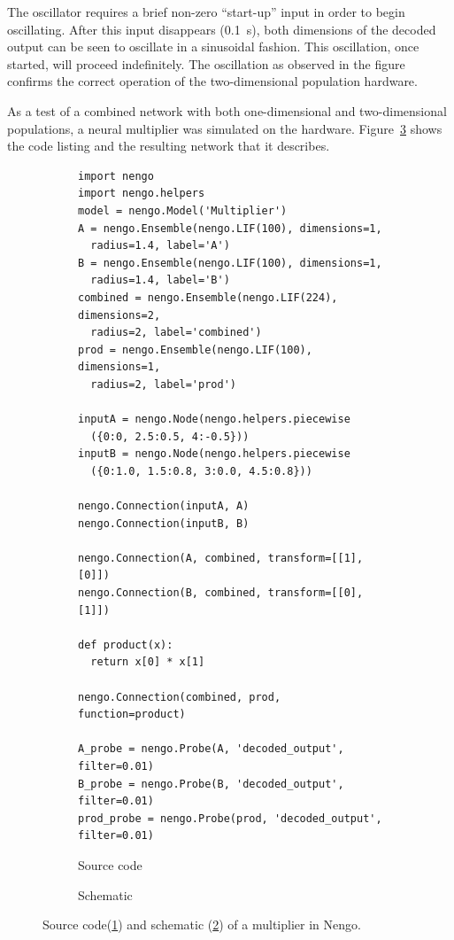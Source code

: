 \documentclass[english]{article}
\begin{document}
The oscillator requires a brief non-zero ``start-up'' input in order to begin oscillating.
After this input disappears (0.1~s), both dimensions of the decoded output can be seen to
oscillate in a sinusoidal fashion. This oscillation, once started, will proceed indefinitely.
The oscillation as observed in the figure confirms the correct operation of the two-dimensional
population hardware.

As a test of a combined network with both one-dimensional and two-dimensional populations,
a neural multiplier was simulated on the hardware. Figure~\ref{lst:multiplier} shows
the code listing and the resulting network that it describes.

\begin{figure}
\centering

\begin{subfigure}[b]{\textwidth}
\centering
\lstset{language=Python}
\begin{lstlisting}[frame=single]
import nengo
import nengo.helpers
model = nengo.Model('Multiplier')
A = nengo.Ensemble(nengo.LIF(100), dimensions=1,
  radius=1.4, label='A')
B = nengo.Ensemble(nengo.LIF(100), dimensions=1,
  radius=1.4, label='B')
combined = nengo.Ensemble(nengo.LIF(224), dimensions=2,
  radius=2, label='combined')
prod = nengo.Ensemble(nengo.LIF(100), dimensions=1,
  radius=2, label='prod')

inputA = nengo.Node(nengo.helpers.piecewise
  ({0:0, 2.5:0.5, 4:-0.5}))
inputB = nengo.Node(nengo.helpers.piecewise
  ({0:1.0, 1.5:0.8, 3:0.0, 4.5:0.8}))

nengo.Connection(inputA, A)
nengo.Connection(inputB, B)

nengo.Connection(A, combined, transform=[[1],[0]])
nengo.Connection(B, combined, transform=[[0],[1]])

def product(x):
  return x[0] * x[1]

nengo.Connection(combined, prod, function=product)

A_probe = nengo.Probe(A, 'decoded_output', filter=0.01)
B_probe = nengo.Probe(B, 'decoded_output', filter=0.01)
prod_probe = nengo.Probe(prod, 'decoded_output', filter=0.01)
\end{lstlisting}
\caption{Source code}
\label{lst:multiplier:code}
\end{subfigure}

\begin{subfigure}[b]{0.3\textwidth}
\centering
\caption{Schematic}
\label{lst:multiplier:schematic}
\end{subfigure}

\caption[A multiplier in Nengo.]
{Source code(\ref{lst:multiplier:code}) and schematic (\ref{lst:multiplier:schematic})
of a multiplier in Nengo.}
\label{lst:multiplier}
\end{figure}
\end{document}
